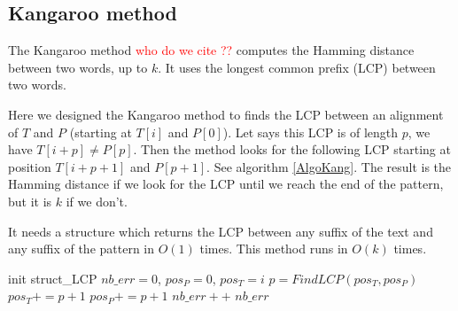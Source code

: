 \documentclass[preprint,12pt]{elsarticle}
\begin{document}




\subsection{Kangaroo method}

The Kangaroo method \textcolor{red}{who do we cite ??}
computes the Hamming distance between two words, up to $k$.
It uses the longest common prefix (LCP) between two words.



Here we designed the Kangaroo method to finds the LCP between an alignment of $T$ and $P$
(starting at $T[i]$ and $P[0]$).
Let says this LCP is of length $p$, we have $T[i+p] \neq P[p]$.
Then the method looks for the following LCP starting at position $T[i+p+1]$ and $P[p+1]$.
See algorithm \ref{AlgoKang}.
The result is the Hamming distance if we look for the LCP until we reach the end of the pattern,
but it is $k$ if we don't.

It needs a structure which returns the LCP between any suffix of the text and any suffix of the pattern
in $O(1)$ times.
This method runs in $O(k)$ times.




\begin{algorithm}
\caption{$Kangaroo(T, P, i, k)$}
\label{AlgoKang}
\begin{algorithmic}

\STATE init struct\_LCP
\STATE $nb\_err = 0$, $pos_P = 0$, $pos_T = i$
		\STATE $p = FindLCP(pos_T, pos_P)$
		\STATE $pos_T += p + 1$
		\STATE $pos_P += p +1$
		\STATE $nb\_err++$
		\ENDWHILE
\RETURN $nb\_err$

\end{algorithmic}
\end{algorithm}
\end{document}
